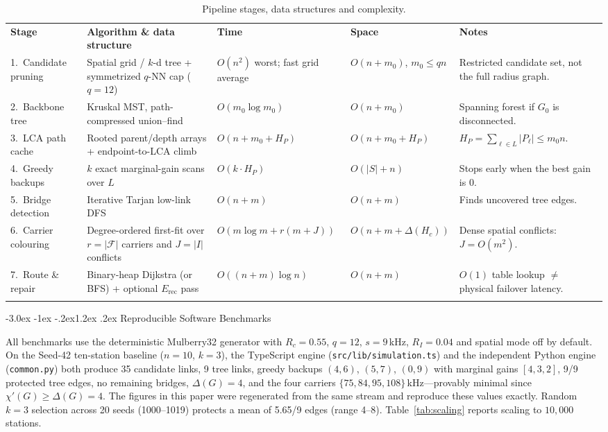 \documentclass[10pt,a4paper]{article}
\makeatletter
\renewcommand\section{\@startsection{section}{1}{\z@}%
  {-3.0ex \@plus -1ex \@minus -.2ex}{1.2ex \@plus .2ex}%
  {\normalfont\large\bfseries}}
\newcommand\toprule{\noalign{\hrule height 0.8pt\vskip 2pt}}
\newcommand\midrule{\noalign{\vskip 1pt\hrule height 0.4pt\vskip 2pt}}
\newcommand\bottomrule{\noalign{\vskip 1pt\hrule height 0.8pt}}
\newcommand\thd[1]{\textbf{#1}}
\newcommand\kHz{\,kHz}
\makeatother
\begin{document}
\begin{table}[h]
\caption{Pipeline stages, data structures and complexity.}\label{tab:complexity}
\footnotesize
\begin{tabularx}{\textwidth}{@{}P{2.5cm}P{4.3cm}P{2.9cm}P{2.4cm}L@{}}
\toprule
\thd{Stage} & \thd{Algorithm \& data structure} & \thd{Time} & \thd{Space} & \thd{Notes}\\
\midrule
1.~Candidate pruning & Spatial grid / $k$-d tree + symmetrized $q$-NN cap ($q=12$) & $O(n^2)$ worst; fast grid average & $O(n+m_0)$, $m_0\le qn$ & Restricted candidate set, not the full radius graph.\\
2.~Backbone tree & Kruskal MST, path-compressed union--find & $O(m_0\log m_0)$ & $O(n+m_0)$ & Spanning forest if $G_0$ is disconnected.\\
3.~LCA path cache & Rooted parent/depth arrays + endpoint-to-LCA climb & $O(n+m_0+H_P)$ & $O(n+m_0+H_P)$ & $H_P=\sum_{\ell\in L}|P_\ell|\le m_0n$.\\
4.~Greedy backups & $k$ exact marginal-gain scans over $L$ & $O(k\cdot H_P)$ & $O(|S|+n)$ & Stops early when the best gain is 0.\\
5.~Bridge detection & Iterative Tarjan low-link DFS & $O(n+m)$ & $O(n+m)$ & Finds uncovered tree edges.\\
6.~Carrier colouring & Degree-ordered first-fit over $r=|\mathcal F|$ carriers and $J=|I|$ conflicts & $O(m\log m+r(m+J))$ & $O(n+m+\Delta(H_c))$ & Dense spatial conflicts: $J=O(m^2)$.\\
7.~Route \& repair & Binary-heap Dijkstra (or BFS) + optional $E_\text{rec}$ pass & $O((n+m)\log n)$ & $O(n+m)$ & $O(1)$ table lookup $\neq$ physical failover latency.\\
\bottomrule
\end{tabularx}
\end{table}

\section{Reproducible Software Benchmarks}\label{sec:bench}

All benchmarks use the deterministic Mulberry32 generator with $R_c=0.55$, $q=12$, $s=9$\kHz, $R_I=0.04$ and spatial mode off
by default. On the Seed-42 ten-station baseline ($n=10$, $k=3$), the TypeScript engine (\texttt{src/lib/simulation.ts}) and
the independent Python engine (\texttt{common.py}) both produce 35 candidate links, 9 tree links, greedy backups
$(4,6)$, $(5,7)$, $(0,9)$ with marginal gains $[4,3,2]$, 9/9 protected tree edges, no remaining bridges, $\Delta(G)=4$, and the
four carriers $\{75,84,95,108\}$\kHz---provably minimal since $\chi'(G)\ge\Delta(G)=4$. The figures in this paper were regenerated
from the same stream and reproduce these values exactly. Random $k=3$ selection across 20 seeds (1000--1019) protects a mean of
5.65/9 edges (range 4--8). Table~\ref{tab:scaling} reports scaling to $10{,}000$ stations.
\end{document}
